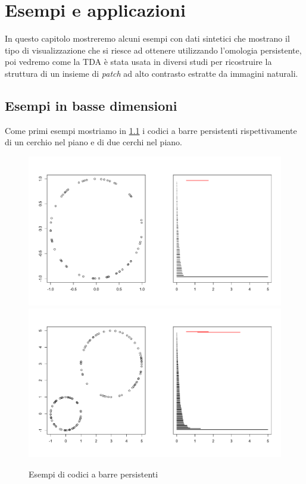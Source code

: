 \chapter{Esempi e applicazioni}\label{cap:esempi}

In questo capitolo mostreremo alcuni esempi con dati sintetici che mostrano il tipo di visualizzazione che si riesce ad ottenere utilizzando l'omologia persistente, poi vedremo come la TDA è stata usata in diversi studi per ricostruire la struttura di un insieme di \emph{patch} ad alto contrasto estratte da immagini naturali.

\section{Esempi in basse dimensioni}

Come primi esempi mostriamo in \cref{fig:examplecirclesbarcodes} i codici a barre persistenti rispettivamente di un cerchio nel piano e di due cerchi nel piano.

\begin{figure}[h]
  \caption{Esempi di codici a barre persistenti}
  \label{fig:examplecirclesbarcodes}
  \centering
  \includegraphics[width=.8\linewidth]{gfx/circle_persistence.pdf}
  \centering
  \includegraphics[width=.8\linewidth]{gfx/two_circles.pdf}
\end{figure}

